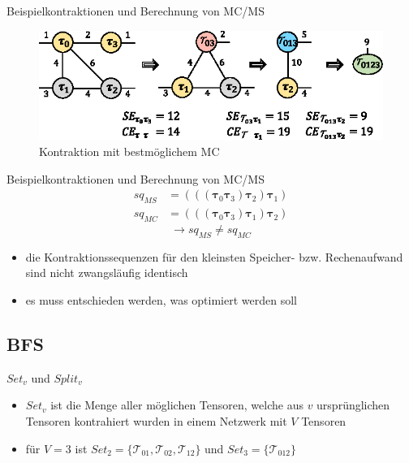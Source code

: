 \documentclass{beamer}
\newcommand{\Tau}{\bm{\mathcal{T}}}
\newcommand{\tauB}{\bm{\tau}}
\begin{document}
\begin{frame}{Beispielkontraktionen und Berechnung von MC/MS}
	\begin{figure}
		\includegraphics{figure_03_d}
		\caption*{Kontraktion mit bestmöglichem MC}
	\end{figure}
\end{frame}

\begin{frame}{Beispielkontraktionen und Berechnung von MC/MS}
	\begin{align*}
		sq_{MS} & = (((\tauB_{0} \tauB_{3}) \tauB_{2}) \tauB_{1}) \\
		sq_{MC} & = (((\tauB_{0} \tauB_{3}) \tauB_{1}) \tauB_{2})
	\end{align*}
	\begin{equation*}
		\rightarrow sq_{MS} \neq sq_{MC}
	\end{equation*}
	\begin{itemize}
		\item die Kontraktionssequenzen für den kleinsten Speicher- bzw. Rechenaufwand sind nicht zwangsläufig identisch
		\item es muss entschieden werden, was optimiert werden soll
	\end{itemize}
\end{frame}


\subsection{BFS}

\begin{frame}{$Set_v$ und $Split_v$}
	\begin{itemize}
		\item $Set_v$ ist die Menge aller möglichen Tensoren, welche aus $v$ ursprünglichen Tensoren kontrahiert wurden in einem Netzwerk mit $V$ Tensoren
		\item für $V = 3$ ist $Set_2 = \{\Tau_{01}, \Tau_{02}, \Tau_{12} \}$ und $Set_3 = \{\Tau_{012} \}$
	\end{itemize}
\end{frame}
\end{document}

